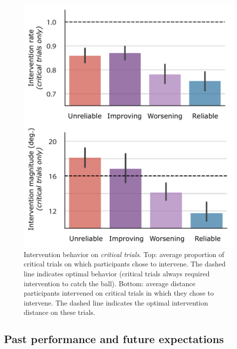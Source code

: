 \documentclass[10pt,letterpaper]{article}
\begin{document}
\begin{figure}[h]
\begin{center}
\includegraphics[width=0.9\linewidth]{img/critical_trial_intervention_summary_vert.pdf}
\end{center}
\caption{Intervention behavior on \textit{critical trials}. 
Top: average proportion of critical trials on which participants chose to intervene. The dashed line indicates optimal behavior (critical trials always required intervention to catch the ball). 
Bottom: average distance participants intervened on critical trials in which they chose to intervene. The dashed line indicates the optimal intervention distance on these trials.} 
\label{fig:critical_trials}
\end{figure}



\subsection{Past performance and future expectations}
\end{document}
